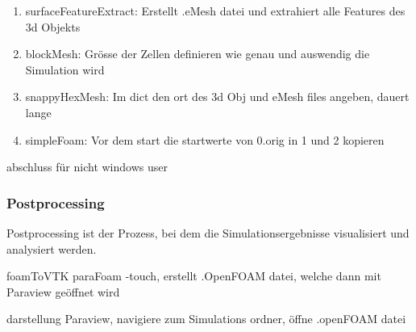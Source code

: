 \begin{enumerate}
    \item surfaceFeatureExtract: Erstellt .eMesh datei und extrahiert alle Features des 3d Objekts
    \item blockMesh: Grösse der Zellen definieren wie genau und auswendig die Simulation wird
    \item snappyHexMesh: Im dict den ort des 3d Obj und eMesh files angeben, dauert lange
    \item simpleFoam: Vor dem start die startwerte von 0.orig in 1 und 2 kopieren
\end{enumerate}

abschluss für nicht windows user



\subsubsection{Postprocessing}
Postprocessing ist der Prozess, bei dem die Simulationsergebnisse visualisiert und analysiert werden. 


foamToVTK
paraFoam -touch, erstellt .OpenFOAM datei, welche dann mit Paraview geöffnet wird

darstellung
Paraview, navigiere zum Simulations ordner, öffne .openFOAM datei

